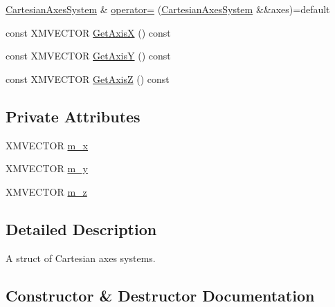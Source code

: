 \begin{DoxyCompactItemize}
\item 
\hyperlink{structmage_1_1_cartesian_axes_system}{Cartesian\+Axes\+System} \& \hyperlink{structmage_1_1_cartesian_axes_system_ad35384f10ad5a84787ef0cc5507955e9}{operator=} (\hyperlink{structmage_1_1_cartesian_axes_system}{Cartesian\+Axes\+System} \&\&axes)=default
\item 
const X\+M\+V\+E\+C\+T\+OR \hyperlink{structmage_1_1_cartesian_axes_system_ab70c54e8cabfc012b72605eb16400243}{Get\+AxisX} () const
\item 
const X\+M\+V\+E\+C\+T\+OR \hyperlink{structmage_1_1_cartesian_axes_system_ad681b7fa6e591c1446c6882c820982ba}{Get\+AxisY} () const
\item 
const X\+M\+V\+E\+C\+T\+OR \hyperlink{structmage_1_1_cartesian_axes_system_a999919e63e9bedcdbda833011701d427}{Get\+AxisZ} () const
\end{DoxyCompactItemize}
\subsection*{Private Attributes}
\begin{DoxyCompactItemize}
\item 
X\+M\+V\+E\+C\+T\+OR \hyperlink{structmage_1_1_cartesian_axes_system_aa840c10ca92782e8c87c1ab53f0b86e9}{m\+\_\+x}
\item 
X\+M\+V\+E\+C\+T\+OR \hyperlink{structmage_1_1_cartesian_axes_system_a2cc6bc4fe185791a877e1418e85d6b47}{m\+\_\+y}
\item 
X\+M\+V\+E\+C\+T\+OR \hyperlink{structmage_1_1_cartesian_axes_system_abc733e5f82104391b0b352d263313d64}{m\+\_\+z}
\end{DoxyCompactItemize}


\subsection{Detailed Description}
A struct of Cartesian axes systems. 

\subsection{Constructor \& Destructor Documentation}
\hypertarget{structmage_1_1_cartesian_axes_system_a8f6ebcd50aafda44c478b7aa25e1fd25}{}\label{structmage_1_1_cartesian_axes_system_a8f6ebcd50aafda44c478b7aa25e1fd25} 
